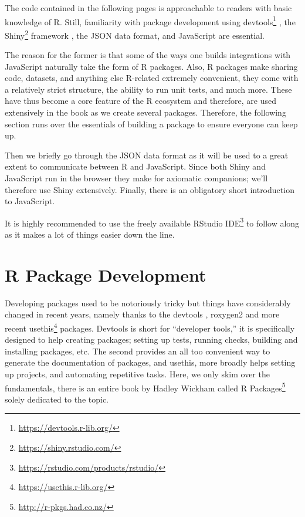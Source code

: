 \documentclass[10pt,]{krantz}
\renewcommand{\href}[2]{#2\footnote{\url{#1}}}
\begin{document}
The code contained in the following pages is approachable to readers with basic knowledge of R. Still, familiarity with package development using \href{https://devtools.r-lib.org/}{devtools} \citep{R-devtools}, the \href{https://shiny.rstudio.com/}{Shiny} framework \citep{R-shiny}, the JSON data format, and JavaScript are essential.

The reason for the former is that some of the ways one builds integrations with JavaScript naturally take the form of R packages. Also, R packages make sharing code, datasets, and anything else R-related extremely convenient, they come with a relatively strict structure, the ability to run unit tests, and much more. These have thus become a core feature of the R ecosystem and therefore, are used extensively in the book as we create several packages. Therefore, the following section runs over the essentials of building a package to ensure everyone can keep up.

Then we briefly go through the JSON data format as it will be used to a great extent to communicate between R and JavaScript. Since both Shiny and JavaScript run in the browser they make for axiomatic companions; we'll therefore use Shiny extensively. Finally, there is an obligatory short introduction to JavaScript.

It is highly recommended to use the freely available \href{https://rstudio.com/products/rstudio/}{RStudio IDE} to follow along as it makes a lot of things easier down the line.

\hypertarget{basics-package-dev}{%
\section{R Package Development}\label{basics-package-dev}}

Developing packages used to be notoriously tricky but things have considerably changed in recent years, namely thanks to the devtools \citep{R-devtools}, roxygen2 \citep{R-roxygen2} and more recent \href{https://usethis.r-lib.org/}{usethis} \citep{R-usethis} packages. Devtools is short for ``developer tools,'' it is specifically designed to help creating packages; setting up tests, running checks, building and installing packages, etc. The second provides an all too convenient way to generate the documentation of packages, and usethis, more broadly helps setting up projects, and automating repetitive tasks. Here, we only skim over the fundamentals, there is an entire book by Hadley Wickham called \href{http://r-pkgs.had.co.nz/}{R Packages} solely dedicated to the topic.
\end{document}
